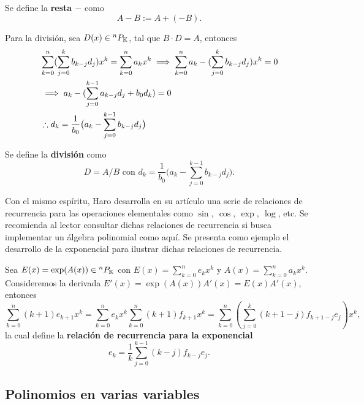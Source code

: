 Se define la \textbf{resta $-$} como
\begin{equation}
 A - B := A + (-B).
 \label{eq:polisub}
\end{equation}


Para la división, sea $D(x) \in {^{n}P_{\mathbb{K}}}$, tal que  $B \cdot D = A $,  entonces 
\begin{align*}
 & \sum_{k=0}^n  (\sum_{j=0}^k b_{k-j} d_j )  x^k = \sum_{k=0}^n  a_k  x^k \implies \sum_{k=0}^n  a_k - (\sum_{j=0}^k b_{k-j} d_j )  x^k = 0 \\ 
 &\implies a_k - ( \sum_{j=0}^{k-1}a_{k-j} d_j + b_0 d_k ) = 0 \\
 & \therefore d_k = \frac{1}{b_0} \big( a_k - \sum_{j=0}^{k-1} b_{k-j} d_j \big)  
\end{align*}

Se define la \textbf{división} como
\begin{equation}
 D = A/B \text{ con } d_k = \frac{1}{b_0} \big( a_k - \sum_{j=0}^{k-1} b_{k-j} d_j \big).
 \label{eq:polidiv}
\end{equation}

Con el mismo espíritu, Haro desarrolla en su artículo \cite{Haro2009} una serie de relaciones de recurrencia para las operaciones elementales como $\sin, \ \cos, \  \exp, \ \log$, etc. Se recomienda al lector consultar dichas relaciones de recurrencia si busca implementar un álgebra polinomial como aquí. Se presenta como ejemplo el desarrollo de la exponencial para ilustrar dichas relaciones de recurrencia. 

Sea $E(x) = \exp (A(x)) \in {^{n}P_{\mathbb{K}}}$ con $E(x) = \sum_{k=0}^n e_k x^k$ y $A(x) = \sum_{k=0}^n a_k x^k$. Consideremos la derivada $E'(x) = \exp (A(x)) A'(x) = E(x) A'(x)$, entonces
\begin{equation*}
 \sum_{k=0}^n (k+1)e_{k+1}x^k = \sum_{k=0}^n e_k x^k \sum_{k=0}^n (k+1)f_{k+1} x^k = \sum_{k=0}^n \left(\sum_{j=0}^{k} (k+1-j)f_{k+1-j} e_j \right) x^k,
\end{equation*}
la cual define la \textbf{relación de recurrencia para la exponencial}
\begin{equation}
e_k = \frac{1}{k} \sum_{j=0}^{k-1} (k-j) f_{k-j} e_j.
\end{equation}


\subsection{Polinomios en varias variables}
\label{sec:pknN}

